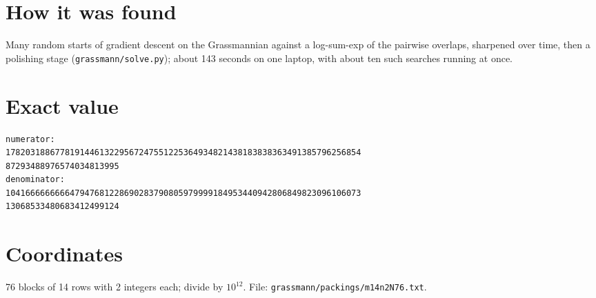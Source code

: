 \documentclass[11pt,a4paper]{article}
\begin{document}
\section{How it was found}
Many random starts of gradient descent on the Grassmannian against a log-sum-exp of the pairwise overlaps, sharpened over time, then a polishing stage (\texttt{grassmann/solve.py}); about 143 seconds on one laptop, with about ten such searches running at once.


\appendix
\section{Exact value}
{\small
\begin{verbatim}
numerator:
178203188677819144613229567247551225364934821438183838363491385796256854
87293488976574034813995
denominator:
104166666666647947681228690283790805979999184953440942806849823096106073
13068533480683412499124
\end{verbatim}}

\section{Coordinates}
76 blocks of 14 rows with 2 integers each; divide by $10^{12}$. File: \texttt{grassmann/packings/m14n2N76.txt}.
{\tiny
\begin{multicols}{4}
\end{multicols}}
\end{document}
